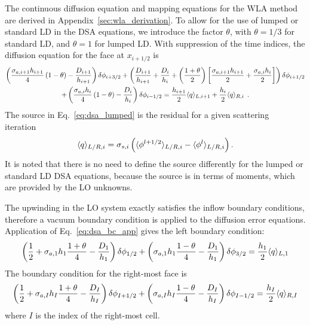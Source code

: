 The continuous diffusion equation and mapping equations for the WLA method are derived in Appendix~\ref{sec:wla_derivation}.
To allow for the use of lumped
or standard LD in the DSA equations, we introduce the factor $\theta$, with
$\theta=1/3$ for standard
LD, and $\theta=1$ for lumped LD.  With suppression of the time indices, the diffusion equation for the face at $x_{i+1/2}$ is 
\begin{multline}\label{eq:dsa_lumped}
    \left(\frac{\sigma_{a,i+1} h_{i+1}}{4}\left(1 - \theta\right)  -
        \frac{D_{i+1}}{h_{i+1}}\right)\delta\phi_{i+3/2} + \left(\frac{D_{i+1}}{h_{i+1}} +
        \frac{D_{i}}{h_i} + \left(\frac{1+\theta}{2} \right)\left[\frac{\sigma_{a,i+1} h_{i+1}}{2} + \frac{\sigma_{a,i}
        h_{i}}{2}\right]\right)\delta\phi_{i+1/2} \\ + \left(\frac{\sigma_{a,i}
        h_{i}}{4}\left(1 - \theta\right) -
        \frac{D_{i}}{h_{i}}\right)\delta\phi_{i-1/2} = \frac{h_{i+1}}{2} \langle q \rangle_{L,i+1} +
        \frac{h_{i}}{2}\langle q \rangle_{R,i}
        \;\,. 
\end{multline}
The source in Eq.~\eqref{eq:dsa_lumped} is the residual for a given scattering iteration~\cite{morel_dsa,lewis}
\begin{equation}\label{eq:dsa_src}
    \langle q \rangle_{L/R,i} = \sigma_{s,i}\left(\langle \phi^{l+1/2} \rangle_{L/R,i} -
    \langle \phi^{l} \rangle_{L/R,i}\right).
\end{equation}
It is noted that there is no need to define the source differently for the lumped or
standard LD DSA equations, because the source is in terms of moments, which are provided
by the LO unknowns.

The upwinding in the LO system exactly satisfies the inflow boundary conditions, therefore
a vacuum boundary condition is applied to the diffusion error equations.
Application of Eq.~\eqref{eq:dsa_bc_app} gives the left boundary condition:
\begin{equation}\label{eq:bc_dsa}
    \left(\frac{1}{2}+ \sigma_{a,1}h_1\frac{1+\theta}{4} - \frac{D_1}{h_1}\right)\delta\phi_{1/2} +
    \left( {\sigma_{a,1}{h_1}}\frac{1-\theta}{4} - \frac{D_1}{h_1}  \right)\delta \phi_{3/2} =
    \frac{h_1}{2} \langle q \rangle_{L,1}
\end{equation}
The boundary condition for the right-most face is
\begin{equation}\label{eq:bc_dsar}
    \left(\frac{1}{2}+ \sigma_{a,I}h_I\frac{1+\theta}{4} - \frac{D_I}{h_I}\right)\delta\phi_{I+1/2} +
    \left( {\sigma_{a,I}{h_I}}\frac{1-\theta}{4} - \frac{D_I}{h_I}  \right)\delta\phi_{I-1/2} =
    \frac{h_I}{2} \langle q \rangle_{R,I}
\end{equation}
where $I$ is the index of the right-most cell. 

